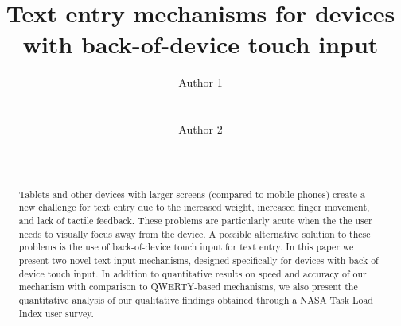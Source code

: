 \documentclass{chi2011}
\begin{document}
\setlength{\paperheight}{11in}
\setlength{\paperwidth}{8.5in}
\setlength{\pdfpageheight}{\paperheight}
\setlength{\pdfpagewidth}{\paperwidth}


\title{Text entry mechanisms for devices with back-of-device touch input}
\author{
  \alignauthor Author 1\\
    \\
    \\
  \alignauthor Author 2\\
    \\
    \\
}

\maketitle

\begin{abstract}
Tablets and other devices with larger screens (compared to mobile phones) create a new challenge for text entry due to the increased weight, increased finger movement, and lack of tactile feedback.  These problems are particularly acute when the the user needs to visually focus away from the device. A possible alternative solution to these problems is the use of back-of-device touch input for text entry. In this paper we present two novel text input mechanisms, designed specifically for devices with back-of-device touch input.  In addition to quantitative results on speed and accuracy of our mechanism with comparison to QWERTY-based mechanisms, we also present the quantitative analysis of our qualitative findings obtained through a NASA Task Load Index user survey.
\end{abstract}







%


\end{document}
